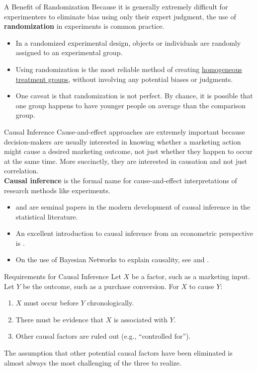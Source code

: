 \documentclass[pdf]{beamer}
\newcommand{\empr}[1]{{\color{franklinblue}\textbf{#1}}}
\theoremstyle{remark}
\theoremstyle{definition}
\begin{document}
\begin{frame}[t]{A Benefit of Randomization}
Because it is generally extremely difficult for experimenters to eliminate bias using only their expert judgment, the use of \empr{randomization} in experiments is common practice. 
\begin{itemize}
\item In a randomized experimental design, objects or individuals are randomly assigned to an experimental group. 
\item Using randomization is the most reliable method of creating \underline{homogeneous treatment groups}, without involving any potential biases or judgments. 
\item One caveat is that randomization is not perfect. By chance, it is possible that one group happens to have younger people on average than the comparison group.
\end{itemize}
\end{frame}

\begin{frame}[t]{Causal Inference}
Cause-and-effect approaches are extremely important because decision-makers are usually interested in knowing whether a marketing action might cause a desired marketing outcome, not just whether they happen to occur at the same time. More succinctly, they are interested in causation and not just correlation. \\
\vspace{1.5ex}
\empr{Causal inference} is the formal name for cause-and-effect interpretations of research methods like experiments.
\small
\begin{itemize}
\item \cite{rubin1974} and \cite{holland1986} are seminal papers in the modern development of causal inference in the statistical literature. 
\item An excellent introduction to causal inference from an econometric perspective is \cite{angrist2009}. 
\item On the use of Bayesian Networks to explain causality, see \cite{pearl2009} and \cite{pearl2018}. 
\end{itemize}
\end{frame}

\begin{frame}[t]{Requirements for Causal Inference}
Let $X$ be a factor, such as a marketing input. Let $Y$ be the outcome, such as a purchase conversion. For $X$ to cause $Y$: \\
\vspace{1.5ex}
\begin{enumerate}
\item $X$ must occur before $Y$ chronologically.
\item There must be evidence that $X$ is associated with $Y$.
\item Other causal factors are ruled out (e.g., “controlled for”).
\end{enumerate}
The assumption that other potential causal factors have been eliminated is almost always the most challenging of the three to realize. 
\end{frame}
\end{document}

